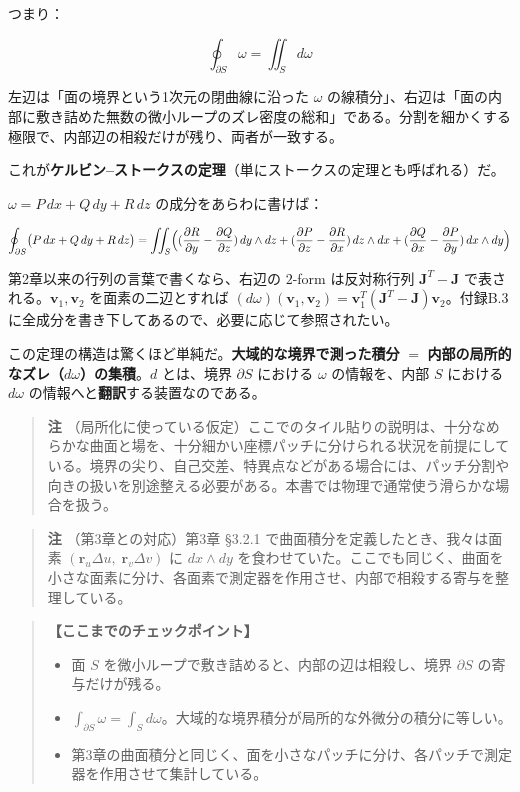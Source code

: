 \documentclass[a4paper,12pt,openany]{book}
\begin{document}
つまり：

\[\oint_{\partial S} \omega = \iint_S d\omega\]

左辺は「面の境界という1次元の閉曲線に沿った \(\omega\)
の線積分」、右辺は「面の内部に敷き詰めた無数の微小ループのズレ密度の総和」である。分割を細かくする極限で、内部辺の相殺だけが残り、両者が一致する。

これが\textbf{ケルビン–ストークスの定理}（単にストークスの定理とも呼ばれる）だ。

\(\omega = P\,dx + Q\,dy + R\,dz\) の成分をあらわに書けば：

\[\oint_{\partial S} \bigl(P\,dx + Q\,dy + R\,dz\bigr) = \iint_S \Bigl( (\frac{\partial R}{\partial y} - \frac{\partial Q}{\partial z})\,dy \wedge dz + (\frac{\partial P}{\partial z} - \frac{\partial R}{\partial x})\,dz \wedge dx + (\frac{\partial Q}{\partial x} - \frac{\partial P}{\partial y})\,dx \wedge dy \Bigr)\]

第2章以来の行列の言葉で書くなら、右辺の \(2\)-form は反対称行列
\(\mathbf{J}^T - \mathbf{J}\) で表される。\(\mathbf{v}_1, \mathbf{v}_2\)
を面素の二辺とすれば
\((d\omega)(\mathbf{v}_1, \mathbf{v}_2) = \mathbf{v}_1^T(\mathbf{J}^T - \mathbf{J})\mathbf{v}_2\)。付録B.3に全成分を書き下してあるので、必要に応じて参照されたい。

この定理の構造は驚くほど単純だ。\textbf{大域的な境界で測った積分} \(=\)
\textbf{内部の局所的なズレ（$d\omega$）の集積}。\(d\) とは、境界
\(\partial S\) における \(\omega\) の情報を、内部 \(S\) における
\(d\omega\) の情報へと\textbf{翻訳}する装置なのである。

\begin{quote}
\textbf{注}
（局所化に使っている仮定）ここでのタイル貼りの説明は、十分なめらかな曲面と場を、十分細かい座標パッチに分けられる状況を前提にしている。境界の尖り、自己交差、特異点などがある場合には、パッチ分割や向きの扱いを別途整える必要がある。本書では物理で通常使う滑らかな場合を扱う。
\end{quote}

\begin{quote}
\textbf{注} （第3章との対応）第3章 §3.2.1
で曲面積分を定義したとき、我々は面素
\((\mathbf{r}_u\Delta u,\;\mathbf{r}_v\Delta v)\) に \(dx \wedge dy\)
を食わせていた。ここでも同じく、曲面を小さな面素に分け、各面素で測定器を作用させ、内部で相殺する寄与を整理している。
\end{quote}

\begin{quote}
\textbf{【ここまでのチェックポイント】}

\begin{itemize}
\item
  面 \(S\) を微小ループで敷き詰めると、内部の辺は相殺し、境界
  \(\partial S\) の寄与だけが残る。
\item
  \(\int_{\partial S} \omega = \int_S d\omega\)。大域的な境界積分が局所的な外微分の積分に等しい。
\item
  第3章の曲面積分と同じく、面を小さなパッチに分け、各パッチで測定器を作用させて集計している。
\end{itemize}
\end{quote}
\end{document}
